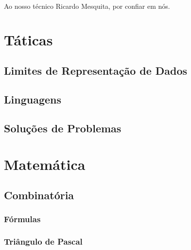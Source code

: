 





\begin{dedication}
\Large{Ao nosso técnico Ricardo Mesquita, por confiar em nós.}
\end{dedication}

\tableofcontents

\chapter{Táticas}
    \section{Limites de Representação de Dados}
        
    \section{Linguagens}
        
        \newpage
    \section{Soluções de Problemas}
        
        \newpage
        
\chapter{Matemática}
    \section{Combinatória}
        \subsection{Fórmulas}
            
        \subsection{Triângulo de Pascal}
            
            \newpage

